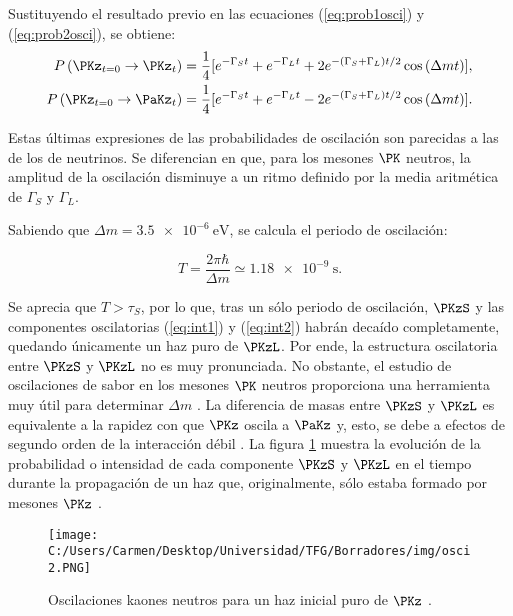 Sustituyendo el resultado previo en las ecuaciones (\ref{eq:prob1osci}) y (\ref{eq:prob2osci}), se obtiene:
\begin{align}
P\left(\PKz_{t=0} \rightarrow \PKz_{t}\right) &= \dfrac{1}{4}[e^{-\Gamma_{S}t}+e^{-\Gamma_{L}t}+ 2e^{-\left(\Gamma_{S}+\Gamma_{L}\right)t/2} \cos \left(\Delta mt\right)],\label{eq:int1} \\
P\left(\PKz_{t=0} \rightarrow \PaKz_{t}\right) &= \dfrac{1}{4}[e^{-\Gamma_{S}t}+e^{-\Gamma_{L}t}-2e^{-\left(\Gamma_{S}+\Gamma_{L}\right)t/2} \cos \left(\Delta mt\right)].\label{eq:int2}
\end{align}

Estas últimas expresiones de las probabilidades de oscilación son parecidas a las de los de neutrinos. Se diferencian en que, para los mesones $\PK$ neutros, la amplitud de la oscilación disminuye a un ritmo definido por la media aritmética de $\Gamma_{S}$ y $\Gamma_{L}$.

Sabiendo que $\Delta m = \SI{3,5e-6}{\eV}$, se calcula el periodo de oscilación:

\begin{equation}
T=\dfrac{2\pi\hbar}{\Delta m} \simeq \SI{1.18e-9}{\second}.
\end{equation}

Se aprecia que $T>\tau_{S}$, por lo que, tras un sólo periodo de oscilación, $\PKzS$ y las componentes oscilatorias (\ref{eq:int1}) y (\ref{eq:int2}) habrán decaído completamente, quedando únicamente un haz puro de $\PKzL$. Por ende, la estructura oscilatoria entre $\PKzS$ y $\PKzL$ no es muy pronunciada.  No obstante, el estudio de oscilaciones de sabor en los mesones $\PK$ neutros proporciona una herramienta muy útil para determinar $\Delta m$ \cite{Thomson}. La diferencia de masas entre $\PKzS$ y $\PKzL$ es equivalente a la rapidez con que $\PKz$ oscila a $\PaKz$ y, esto, se debe a efectos de segundo orden de la interacción débil \cite{Perkins}. La figura \ref{fig:oscillation2} muestra la evolución de la probabilidad o intensidad de cada componente $\PKzS$ y $\PKzL$ en el tiempo durante la propagación de un haz que, originalmente, sólo estaba formado por mesones $\PKz$ \cite{Thomson}. 

\begin{figure}[!ht]
	\centering
	\texttt{[image: C:/Users/Carmen/Desktop/Universidad/TFG/Borradores/img/osci2.PNG]}
	\caption[Efecto de las oscilaciones de sabor en mesones $\PK$ neutros.]
	{Oscilaciones kaones neutros para un haz inicial puro de $\PKz$ \cite{Thomson}.}
	\label{fig:oscillation2}
\end{figure}